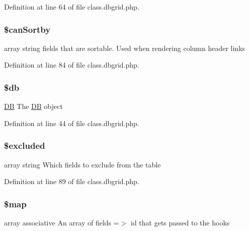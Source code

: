 Definition at line 64 of file class.\-dbgrid.\-php.

\hypertarget{class_db_grid_a233ec0718ad15633825ab07d1f3a744b}{
\subsubsection[{\$can\-Sortby}]{\setlength{\rightskip}{0pt plus 5cm}\$can\-Sortby\hspace{0.3cm}{\ttfamily [protected]}}}\label{class_db_grid_a233ec0718ad15633825ab07d1f3a744b}
array string fields that are sortable. Used when rendering column header links 

Definition at line 84 of file class.\-dbgrid.\-php.

\hypertarget{class_db_grid_a1fa3127fc82f96b1436d871ef02be319}{
\subsubsection[{\$db}]{\setlength{\rightskip}{0pt plus 5cm}\$db\hspace{0.3cm}{\ttfamily [protected]}}}\label{class_db_grid_a1fa3127fc82f96b1436d871ef02be319}
\hyperlink{class_d_b}{D\-B} The \hyperlink{class_d_b}{D\-B} object 

Definition at line 44 of file class.\-dbgrid.\-php.

\hypertarget{class_db_grid_a461d2a3e41e45e6ced688a7ae506c407}{
\subsubsection[{\$excluded}]{\setlength{\rightskip}{0pt plus 5cm}\$excluded\hspace{0.3cm}{\ttfamily [protected]}}}\label{class_db_grid_a461d2a3e41e45e6ced688a7ae506c407}
array string Which fields to exclude from the table 

Definition at line 89 of file class.\-dbgrid.\-php.

\hypertarget{class_db_grid_acdcfcd6e65900bdadd894106750cf520}{
\subsubsection[{\$map}]{\setlength{\rightskip}{0pt plus 5cm}\$map\hspace{0.3cm}{\ttfamily [protected]}}}\label{class_db_grid_acdcfcd6e65900bdadd894106750cf520}
array associative An array of fields =$>$ id that gets passed to the hooks 


